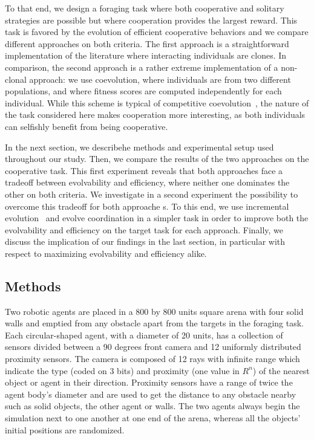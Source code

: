   To that end, we design a foraging task where both cooperative and solitary strategies are possible but where cooperation provides the largest reward. This task is favored by the evolution of efficient cooperative behaviors and we compare different approaches on both criteria. The first approach is a straightforward implementation of the literature where interacting individuals are clones. In comparison, the second approach is a rather extreme implementation of a non-clonal approach: we use coevolution, where individuals are from two different populations, and where fitness scores are computed independently for each individual. While this scheme is typical of competitive coevolution~\cite{Floreano1997, Floreano1998,Panait2005}, the nature of the task considered here makes cooperation more interesting, as both individuals can selfishly benefit from being cooperative.

  In the next section, we describehe methods and experimental setup used throughout our study. Then, we compare the results of the two approaches on the cooperative task. This first experiment reveals that both approaches face a tradeoff between evolvability and efficiency, where neither one dominates the other on both criteria. We investigate in a second experiment the possibility to overcome this tradeoff for both approache s. To this end, we use incremental evolution~\cite{Harvey1994, Urzelai1998} and evolve coordination in a simpler task in order to improve both the evolvability and efficiency on the target task for each approach. Finally, we discuss the implication of our findings in the last section, in particular with respect to maximizing evolvability and efficiency alike.


  \subsection{Methods}
  

  Two robotic agents are placed in a 800 by 800 units square arena with four solid walls and emptied from any obstacle apart from the targets in the foraging task. Each circular-shaped agent, with a diameter of 20 units, has a collection of sensors divided between a 90 degrees front camera and 12 uniformly distributed proximity sensors. The camera is composed of 12 rays with infinite range which indicate the type (coded on 3 bits) and proximity (one value in $R^n$) of the nearest object or agent in their direction. Proximity sensors have a range of twice the agent body's diameter and are used to get the distance to any obstacle nearby such as solid objects, the other agent or walls. The two agents always begin the simulation next to one another at one end of the arena, whereas all the objects' initial positions are randomized.

